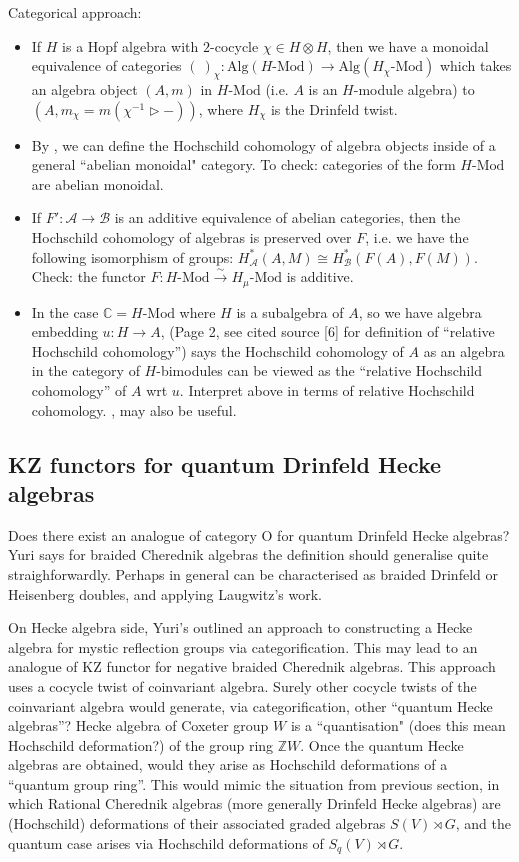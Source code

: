 \documentclass[10pt]{article}
\newcommand{\bb}{\medbreak}
\newcommand{\nt}{\noindent}
\newcommand{\Z}{\mathbb{Z}}
\newcommand{\Cc }{\mathbb{C}}
\newcommand{\rt}{\xrightarrow{}}
\newcommand{\xrt}{\xrightarrow}
\newcommand{\Mod}{\text{-Mod}}
\newcommand{\Alg}{\text{Alg}}
\theoremstyle{definition}
\begin{document}
Categorical approach:
\begin{itemize}
  \item If $H$ is a Hopf algebra with $2$-cocycle $\chi\in H\otimes H$, then we have a monoidal equivalence of categories $(\ )_\chi: \Alg(H\Mod) \to \Alg(H_\chi\Mod)$  which takes an algebra object $(A,m)$ in $H\Mod$ (i.e. $A$ is an $H$-module algebra) to $(A,m_\chi = m(\chi^{-1}\rhd - ))$, where $H_\chi$ is the Drinfeld twist. 
  \item By \cite{ARDIZZONI2007297}, we can define the Hochschild cohomology of algebra objects inside of a general ``abelian monoidal" category. To check: categories of the form $H\Mod$ are abelian monoidal.
  \item If $F':\mathcal{A}\rt \mathcal{B}$ is an additive equivalence of abelian categories, then the Hochschild cohomology of algebras is preserved over $F$, i.e. we have the following isomorphism of groups: $H_\mathcal{A}^*(A,M)\cong H_\mathcal{B}^*(F(A),F(M))$. Check: the functor $F:H\Mod\xrt{\sim} H_\mu\Mod$ is additive. 
  \item In the case $\Cc =H\Mod$ where $H$ is a subalgebra of $A$, so we have algebra embedding $u:H\rt A$, \cite{ARDIZZONI2007297} (Page 2, see cited source [6] for definition of ``relative Hochschild cohomology'') says the Hochschild cohomology of $A$ as an algebra in the category of $H$-bimodules can be viewed as the ``relative Hochschild cohomology'' of $A$ wrt $u$. Interpret above in terms of relative Hochschild cohomology. \cite{2013arXiv13117124S}, \cite{doi10108000927879908826648} may also be useful.
\end{itemize}


\subsection*{KZ functors for quantum Drinfeld Hecke algebras} 
Does there exist an analogue of category O for quantum Drinfeld Hecke algebras? Yuri says for braided Cherednik algebras the definition should generalise quite straighforwardly. Perhaps in general can be characterised as braided Drinfeld or Heisenberg doubles, and applying Laugwitz's work.\bb

\nt On Hecke algebra side, Yuri's outlined an approach to constructing a Hecke algebra for mystic reflection groups via categorification. This may lead to an analogue of KZ functor for negative braided Cherednik algebras. This approach uses a cocycle twist of coinvariant algebra. Surely other cocycle twists of the coinvariant algebra would generate, via categorification, other ``quantum Hecke algebras''? Hecke algebra of Coxeter group $W$ is a ``quantisation" (does this mean Hochschild deformation?) of the group ring $\Z W$. Once the quantum Hecke algebras are obtained, would they arise as Hochschild deformations of a ``quantum group ring''. This would mimic the situation from previous section, in which Rational Cherednik algebras (more generally Drinfeld Hecke algebras) are (Hochschild) deformations of their associated graded algebras $S(V)\rtimes G$, and the quantum case arises via Hochschild deformations of $S_q(V)\rtimes G$.

\fi






\end{document}
